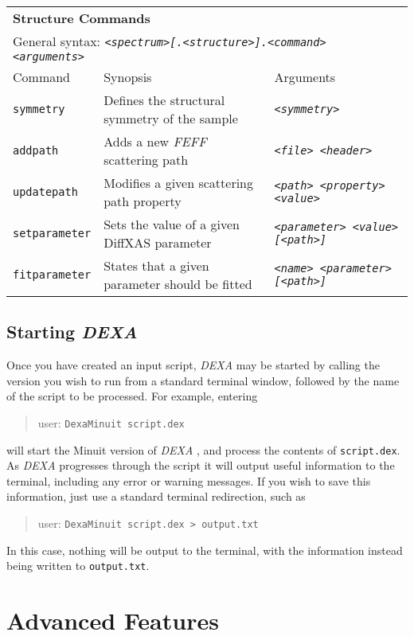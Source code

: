 \documentclass[a4paper,12pt]{report}
\newcommand{\dexa}{\emph{DEXA} }
\newcommand{\feff}{\emph{FEFF} }
\begin{document}
\begin{sidewaystable}
\begin{tabular}{|l|l|l|}
\hline
\hline
\multicolumn{3}{|l|}{\bf Structure Commands} \\
\multicolumn{3}{|l|}{General syntax: \emph{\texttt{<spectrum>[.<structure>].<command> <arguments>}}} \\
\hline
Command & Synopsis & Arguments \\
\hline
\verb|symmetry| & Defines the structural symmetry of the sample & \texttt{\emph{<symmetry>}} \\
\verb|addpath| & Adds a new \feff scattering path & \emph{\texttt{<file> <header>}} \\
\verb|updatepath| & Modifies a given scattering path property & \texttt{\emph{<path> <property> <value>}} \\
\verb|setparameter| & Sets the value of a given DiffXAS parameter &   \texttt{\emph{<parameter> <value> [<path>]}} \\
\verb|fitparameter| & States that a given parameter should be fitted & \texttt{\emph{<name> <parameter> [<path>]}} \\
\hline
\end{tabular}
\caption{\label{table:commands}The list of valid commands for use in a \dexa input script.}
\end{sidewaystable}

\section{Starting \dexa}
Once you have created an input script, \dexa may be started by calling the version you wish to run from a standard terminal window, followed by the name of the script to be processed. For example, entering
\begin{quote}
  user\@@host: \verb|DexaMinuit script.dex|
\end{quote}
will start the Minuit version of \dexa, and process the contents of \verb|script.dex|. As \dexa progresses through the script it will output useful information to the terminal, including any error or warning messages. If you wish to save this information, just use a standard terminal redirection,
such as
\begin{quote}
  user\@@host: \verb|DexaMinuit script.dex > output.txt|
\end{quote}
In this case, nothing will be output to the terminal, with the information instead being written to \verb|output.txt|.

\chapter{Advanced Features}
\label{chapter:advanced}
\end{document}
